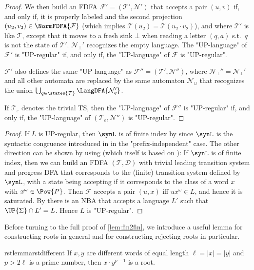 \documentclass[a4paper,USenglish,cleveref,autoref,thm-restate]{lipics-v2021}
\newcommand{\mc}[1]{\ensuremath{\mathcal{#1}}}
\newcommand{\T}{\mc{T}}
\newcommand{\F}{\mc{F}}
\newcommand{\N}{\mc{N}}
\newcommand{\D}{\mc{D}}
\begin{document}
{\begin{proof}
    We then build an FDFA $\F'=(\T',\N')$ that accepts a pair $(u,v)$ if, and only if, it is properly labeled and the second projection $(u_2,v_2)\in \NormFDFA{\F}$ (which implies $\T(u_2)=\T(u_2\cdot v_2)$), and where $\T'$ is like $\T$, except that it moves to a fresh sink $\bot$ when reading a letter $(q,a)$ s.t.\ $q$ is not the state of $\T'$. $\N_\bot'$ recognizes the empty language.
    The "UP-language" of $\F'$ is "UP-regular" if, and only if, the "UP-language" of $\F$ is "UP-regular".

    $\F'$ also defines the same "UP-language" as $\F''=(\T',\N'')$, where $\N_\bot''=\N_\bot'$ and all other automata are replaced by the same automaton $\N_\cup$ that recognizes the union $\bigcup_{q\in \states{\T}}\LangDFA{\N_q'}$.

    If $\T_\varepsilon$ denotes the trivial TS, then the "UP-language" of $\F''$ is "UP-regular" if, and only if, the "UP-language" of $(\T_\varepsilon,\N'')$ is "UP-regular".

\end{proof}

\rstregularEquivalent*
\begin{proof}
    If $L$ is UP-regular, then $\synL$ is of finite index by \cite{Arnold85} since $\synL$ is the syntactic congruence introduced in \cite{Arnold85} in the "prefix-independent" case. The other direction can be shown by using \cite[Theorem~5.7]{AngluinBF18} (which itself is based on \cite[Lemma~5]{CalbrixNP93}): If $\synL$ is of finite index, then we can build an FDFA $(\T,\D)$ with trivial leading transition system and progress DFA that corresponds to the (finite)  transition system defined by $\synL$, with a state being accepting if it corresponds to the class of a word $x$ with $x^\omega \in \Pow{P}$. Then $\F$ accepts a pair $(u,x)$ iff $ux^\omega \in L$, and hence it is saturated. By \cite[Theorem~5.7]{AngluinBF18} there is an NBA that accepts a language $L'$ such that $\UP{\Sigma} \cap L' = L$. Hence $L$ is "UP-regular".
\end{proof}


\rstfinfin*

Before turning to the full proof of \cref{lem:fin2fin}, we introduce a useful lemma for constructing roots in general and for constructing rejecting roots in particular.

\begin{restatable}{rstlemma}{rstdifferent}
    \label{lem:different}
    If $x,y$ are different words of equal length $\ell=|x|=|y|$ and $p>2\ell$ is a prime number, then $x \cdot y^{p-1}$ is a root.


\end{restatable}}
\end{document}
